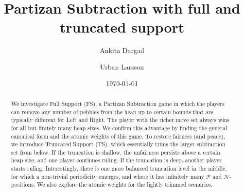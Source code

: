\documentclass[oneside,reqno]{amsart}
\title{Partizan Subtraction with full and truncated support}
\author[Ankita Dargad]{Ankita Dargad}
\author[U. Larsson]{Urban Larsson}
\date{\today}
\begin{document}
\begin{abstract}
    We investigate {\sc Full Support (FS)}, a {\sc Partizan Subtraction} game in which the players can remove any number of pebbles from the heap up to certain bounds that are typically different for Left and Right. The player with the richer move set always wins for all but finitely many heap sizes. We confirm this advantage by finding the general canonical form and the atomic weights of this game. To restore fairness (and peace), we introduce {\sc Truncated Support (TS)}, which essentially trims the larger subtraction set from below. If the truncation is shallow, the unfairness persists above a certain heap size, and one player continues ruling. If the truncation is deep, another player starts ruling. Interestingly, there is one more balanced truncation level in the middle, for which a non-trivial periodicity emerges, and where it has infinitely many $\mathcal P$ and $\mathcal N$-positions. We also explore the atomic weights for the lightly trimmed scenarios.
\end{abstract}
\maketitle








\end{document}
